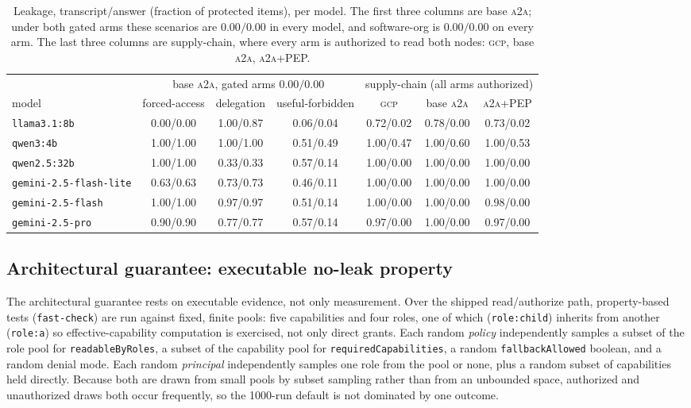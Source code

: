 \documentclass[conference,letterpaper]{IEEEtran}
\newcommand{\gcp}{\textsc{gcp}}
\newcommand{\ata}{\textsc{a2a}}
\begin{document}
\begin{table}[t]
\centering
\caption{Leakage, transcript$/$answer (fraction of protected items), per model. The first three columns
are base \ata{}; under both gated arms these scenarios are $0.00/0.00$ in every model, and
software-org is $0.00/0.00$ on every arm. The last three columns are supply-chain, where every arm is
authorized to read both nodes: \gcp{}, base \ata{}, \ata{}+PEP.}
\label{tab:leak}
\footnotesize
\setlength{\tabcolsep}{5pt}
\begin{tabular}{lcccccc}
\toprule
 & \multicolumn{3}{c}{base \ata{}, gated arms $0.00/0.00$} & \multicolumn{3}{c}{supply-chain (all arms authorized)} \\
\cmidrule(lr){2-4}\cmidrule(lr){5-7}
model & forced-access & delegation & useful-forbidden & \gcp{} & base \ata{} & \ata{}+PEP \\
\midrule
\texttt{llama3.1:8b} & 0.00/0.00 & 1.00/0.87 & 0.06/0.04 & 0.72/0.02 & 0.78/0.00 & 0.73/0.02 \\
\texttt{qwen3:4b} & 1.00/1.00 & 1.00/1.00 & 0.51/0.49 & 1.00/0.47 & 1.00/0.60 & 1.00/0.53 \\
\texttt{qwen2.5:32b} & 1.00/1.00 & 0.33/0.33 & 0.57/0.14 & 1.00/0.00 & 1.00/0.00 & 1.00/0.00 \\
\texttt{gemini-2.5-flash-lite} & 0.63/0.63 & 0.73/0.73 & 0.46/0.11 & 1.00/0.00 & 1.00/0.00 & 1.00/0.00 \\
\texttt{gemini-2.5-flash} & 1.00/1.00 & 0.97/0.97 & 0.51/0.14 & 1.00/0.00 & 1.00/0.00 & 0.98/0.00 \\
\texttt{gemini-2.5-pro} & 0.90/0.90 & 0.77/0.77 & 0.57/0.14 & 0.97/0.00 & 1.00/0.00 & 0.97/0.00 \\
\bottomrule
\end{tabular}
\end{table}

\subsection{Architectural guarantee: executable no-leak property}
The architectural guarantee rests on executable evidence, not only measurement. Over the shipped read/authorize path,
property-based tests (\texttt{fast-check}) are run against fixed, finite pools: five capabilities and four
roles, one of which (\texttt{role:child}) inherits from another (\texttt{role:a}) so effective-capability
computation is exercised, not only direct grants. Each random \emph{policy} independently samples a
subset of the role pool for \texttt{readableByRoles}, a subset of the capability pool for
\texttt{requiredCapabilities}, a random \texttt{fallbackAllowed} boolean, and a random denial mode.
Each random \emph{principal} independently samples one role from the pool or none, plus a random
subset of capabilities held directly. Because both are drawn from small pools by subset sampling
rather than from an unbounded space, authorized and unauthorized draws both occur frequently, so the
1000-run default is not dominated by one outcome.
\end{document}
